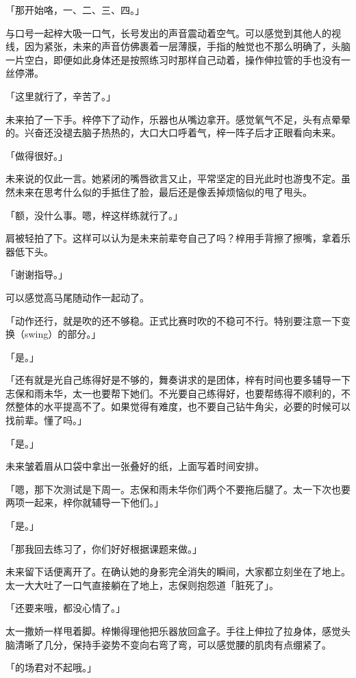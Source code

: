 \documentclass[UTF8]{ctexart}
\begin{document}
    「那开始咯，一、二、三、四。」

    与口号一起梓大吸一口气，长号发出的声音震动着空气。可以感觉到其他人的视线，因为紧张，未来的声音仿佛裹着一层薄膜，手指的触觉也不那么明确了，头脑一片空白，即便如此身体还是按照练习时那样自己动着，操作伸拉管的手也没有一丝停滞。

    「这里就行了，辛苦了。」

    未来拍了一下手。梓停下了动作，乐器也从嘴边拿开。感觉氧气不足，头有点晕晕的。兴奋还没褪去脑子热热的，大口大口呼着气，梓一阵子后才正眼看向未来。

    「做得很好。」

    未来说的仅此一言。她紧闭的嘴唇欲言又止，平常坚定的目光此时也游曳不定。虽然未来在思考什么似的手抵住了脸，最后还是像丢掉烦恼似的甩了甩头。

    「额，没什么事。嗯，梓这样练就行了。」

    肩被轻拍了下。这样可以认为是未来前辈夸自己了吗？梓用手背擦了擦嘴，拿着乐器低下头。

    「谢谢指导。」

    可以感觉高马尾随动作一起动了。

    「动作还行，就是吹的还不够稳。正式比赛时吹的不稳可不行。特别要注意一下变换（swing）的部分。」

    「是。」

    「还有就是光自己练得好是不够的，舞奏讲求的是团体，梓有时间也要多辅导一下志保和雨未华，太一也要帮下她们。不光要自己练得好，也要帮练得不顺利的，不然整体的水平提高不了。如果觉得有难度，也不要自己钻牛角尖，必要的时候可以找前辈。懂了吗。」

    「是。」

    未来皱着眉从口袋中拿出一张叠好的纸，上面写着时间安排。

    「嗯，那下次测试是下周一。志保和雨未华你们两个不要拖后腿了。太一下次也要两项一起来，梓你就辅导一下他们。」

    「是。」

    「那我回去练习了，你们好好根据课题来做。」

    未来留下话便离开了。在确认她的身影完全消失的瞬间，大家都立刻坐在了地上。太一大大吐了一口气直接躺在了地上，志保则抱怨道「脏死了」。

    「还要来哦，都没心情了。」

    太一撒娇一样甩着脚。梓懒得理他把乐器放回盒子。手往上伸拉了拉身体，感觉头脑清晰了几分，保持手姿势不变向右弯了弯，可以感觉腰的肌肉有点绷紧了。

    「的场君对不起哦。」
\end{document}
